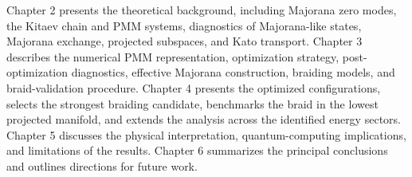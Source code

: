Chapter 2 presents the theoretical background, including Majorana zero modes, the Kitaev chain and PMM systems, diagnostics of Majorana-like states, Majorana exchange, projected subspaces, and Kato transport. Chapter 3 describes the numerical PMM representation, optimization strategy, post-optimization diagnostics, effective Majorana construction, braiding models, and braid-validation procedure. Chapter 4 presents the optimized configurations, selects the strongest braiding candidate, benchmarks the braid in the lowest projected manifold, and extends the analysis across the identified energy sectors. Chapter 5 discusses the physical interpretation, quantum-computing implications, and limitations of the results. Chapter 6 summarizes the principal conclusions and outlines directions for future work.



